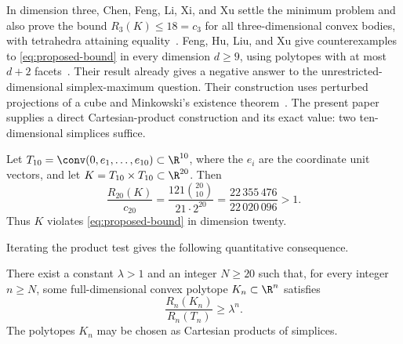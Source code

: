 In dimension three, Chen, Feng, Li, Xi, and Xu settle the minimum problem
and also prove
the bound \(R_3(K)\le18=c_3\) for all
three-dimensional convex bodies, with tetrahedra attaining
equality~\cite[Theorems~1.1 and~1.2]{ChenEtAl}. Feng, Hu, Liu, and Xu give
counterexamples to \eqref{eq:proposed-bound} in every dimension
\(d\ge9\), using polytopes with at most \(d+2\)
facets~\cite[Theorem~1.3]{FengEtAl}. Their result already gives a
negative answer to the unrestricted-dimensional simplex-maximum
question. Their construction uses perturbed projections of a cube and
Minkowski's existence theorem~\cite[Section~4]{FengEtAl}. The present
paper supplies a direct Cartesian-product construction and its exact
value: two ten-dimensional simplices suffice.

\begin{theorem}\label{thm:counterexample}
Let \(T_{10}=\conv(0,e_1,\ldots,e_{10})\subset\R^{10}\), where the
\(e_i\) are the coordinate unit vectors, and let
\(K=T_{10}\times T_{10}\subset\R^{20}\). Then
\[
 \frac{R_{20}(K)}{c_{20}}
 =\frac{121\binom{20}{10}}{21\cdot2^{20}}
 =\frac{22\,355\,476}{22\,020\,096}>1.
\]
Thus \(K\) violates \eqref{eq:proposed-bound} in dimension twenty.
\end{theorem}
Iterating the product test gives the following quantitative consequence.

\begin{corollary}\label{cor:exponential-excess}
There exist a constant \(\lambda>1\) and an integer \(N\ge20\) such that, for every
integer \(n\ge N\), some full-dimensional convex polytope
\(K_n\subset\R^n\) satisfies
\[
 \frac{R_n(K_n)}{R_n(T_n)}\ge\lambda^n.
\]
The polytopes \(K_n\) may be chosen as Cartesian products of simplices.
\end{corollary}
